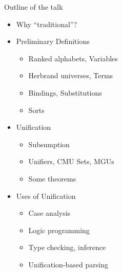\documentclass[pdf,fyma2]{prosper} %
\newcommand{\unhilight}[1]{{\color{gris2}#1}}
\begin{document}
\begin{slide}{Outline of the talk}
	\begin{itemize}
	\item \unhilight{Why ``traditional''?}
	\item \unhilight{Preliminary Definitions}
	    \begin{itemize}
    	\item \unhilight{Ranked alphabets, Variables}
    	\item \unhilight{Herbrand universes, Terms}
    	\item \unhilight{Bindings, Substitutions}
    	\item \unhilight{Sorts}
    	\end{itemize}
	\item \unhilight{Unification}
	    \begin{itemize}
    	\item \unhilight{Subsumption}
    	\item \unhilight{Unifiers, CMU Sets, MGUs}
    	\item \unhilight{Some theorems}
    	\end{itemize}
	\item Uses of Unification
	    \begin{itemize}
    	\item Case analysis
    	\item Logic programming
    	\item Type checking, inference
    	\item Unification-based parsing
    	\end{itemize}
	\end{itemize}
\end{slide}
\end{document}
